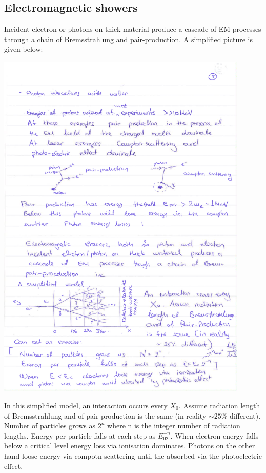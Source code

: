 \subsection{Electromagnetic showers}
Incident electron or photons on thick material produce a cascade of EM processes through a chain of Bremsstrahlung and pair-production. A simplified picture is given below:
\begin{center}
\includegraphics[width=0.90\textwidth]{fig/detector/em_shower.pdf}
\end{center}
In this simplified model, an interaction occurs every $X_0$. Assume radiation length of Bremsstrahlung and of pair-production is the same (in reality $\sim25\%$ different). 
Number of particles grows as $2^n$ where n is the integer number of radiation lengths. Energy per particle falls at each step as $E_02^{-n}$.
When electron energy falls below a critical level energy loss via ionisation dominates. Photons on the other hand loose energy via compotn scattering until the absorbed via the photoelectric effect.

